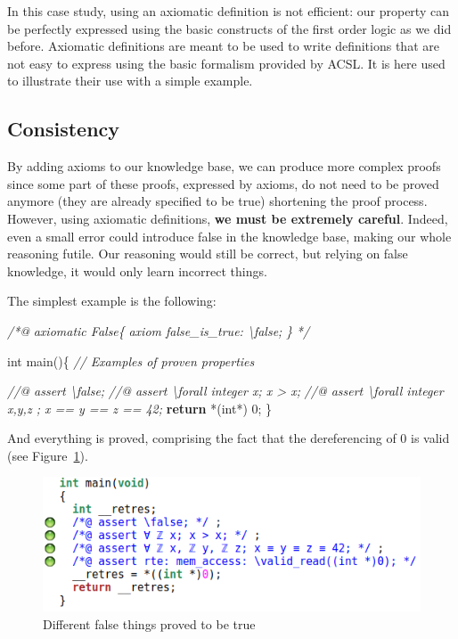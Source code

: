\documentclass[12pt,francais,]{scrbook}
\newenvironment{Shaded}{}{}
\newcommand{\KeywordTok}[1]{\textcolor[rgb]{0.00,0.44,0.13}{\textbf{{#1}}}}
\newcommand{\DataTypeTok}[1]{\textcolor[rgb]{0.56,0.13,0.00}{{#1}}}
\newcommand{\DecValTok}[1]{\textcolor[rgb]{0.25,0.63,0.44}{{#1}}}
\newcommand{\CommentTok}[1]{\textcolor[rgb]{0.38,0.63,0.69}{\textit{{#1}}}}
\newcommand{\NormalTok}[1]{{#1}}
\begin{document}
In this case study, using an axiomatic definition is not efficient: our
property can be perfectly expressed using the basic constructs of the
first order logic as we did before. Axiomatic definitions are meant to
be used to write definitions that are not easy to express using the
basic formalism provided by ACSL. It is here used to illustrate their
use with a simple example.

\subsection{Consistency}\label{consistency}

By adding axioms to our knowledge base, we can produce more complex
proofs since some part of these proofs, expressed by axioms, do not need
to be proved anymore (they are already specified to be true) shortening
the proof process. However, using axiomatic definitions, \textbf{we must
be extremely careful}. Indeed, even a small error could introduce false
in the knowledge base, making our whole reasoning futile. Our reasoning
would still be correct, but relying on false knowledge, it would only
learn incorrect things.

The simplest example is the following:

\begin{footnotesize}\begin{Shaded}
\begin{Highlighting}[]
\CommentTok{/*@}
\CommentTok{  axiomatic False\{}
\CommentTok{    axiom false_is_true: \textbackslash{}false;}
\CommentTok{  \}}
\CommentTok{*/}

\DataTypeTok{int} \NormalTok{main()\{}
  \CommentTok{// Examples of proven properties}

  \CommentTok{//@ assert \textbackslash{}false;}
  \CommentTok{//@ assert \textbackslash{}forall integer x; x > x;}
  \CommentTok{//@ assert \textbackslash{}forall integer x,y,z ; x == y == z == 42;}
  \KeywordTok{return} \NormalTok{*(}\DataTypeTok{int}\NormalTok{*) }\DecValTok{0}\NormalTok{;}
\NormalTok{\}}
\end{Highlighting}
\end{Shaded}\end{footnotesize}

And everything is proved, comprising the fact that the dereferencing of
0 is valid (see Figure~\ref{fig:false-axiom}).

\begin{figure}[htbp]
  \centering
  \includegraphics[scale=0.5]{false_axiom.png}
  \caption{Different false things proved to be true}
  \label{fig:false-axiom}
\end{figure}
\end{document}
